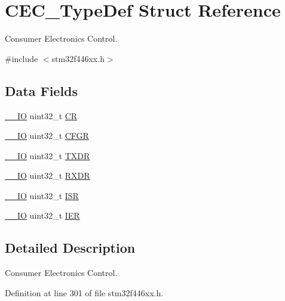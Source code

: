 \hypertarget{struct_c_e_c___type_def}{}\section{C\+E\+C\+\_\+\+Type\+Def Struct Reference}
\label{struct_c_e_c___type_def}


Consumer Electronics Control.  




{\ttfamily \#include $<$stm32f446xx.\+h$>$}

\subsection*{Data Fields}
\begin{DoxyCompactItemize}
\item 
\hyperlink{core__sc300_8h_aec43007d9998a0a0e01faede4133d6be}{\+\_\+\+\_\+\+IO} uint32\+\_\+t \hyperlink{struct_c_e_c___type_def_ab40c89c59391aaa9d9a8ec011dd0907a}{CR}
\item 
\hyperlink{core__sc300_8h_aec43007d9998a0a0e01faede4133d6be}{\+\_\+\+\_\+\+IO} uint32\+\_\+t \hyperlink{struct_c_e_c___type_def_a26f1e746ccbf9c9f67e7c60e61085ec1}{C\+F\+GR}
\item 
\hyperlink{core__sc300_8h_aec43007d9998a0a0e01faede4133d6be}{\+\_\+\+\_\+\+IO} uint32\+\_\+t \hyperlink{struct_c_e_c___type_def_ad7e8d785fff2acfeb8814e43bda8dd72}{T\+X\+DR}
\item 
\hyperlink{core__sc300_8h_aec43007d9998a0a0e01faede4133d6be}{\+\_\+\+\_\+\+IO} uint32\+\_\+t \hyperlink{struct_c_e_c___type_def_a9bf29a9104cb5569823ab892174f9c8c}{R\+X\+DR}
\item 
\hyperlink{core__sc300_8h_aec43007d9998a0a0e01faede4133d6be}{\+\_\+\+\_\+\+IO} uint32\+\_\+t \hyperlink{struct_c_e_c___type_def_ab3c49a96815fcbee63d95e1e74f20e75}{I\+SR}
\item 
\hyperlink{core__sc300_8h_aec43007d9998a0a0e01faede4133d6be}{\+\_\+\+\_\+\+IO} uint32\+\_\+t \hyperlink{struct_c_e_c___type_def_a6566f8cfbd1d8aa7e8db046aa35e77db}{I\+ER}
\end{DoxyCompactItemize}


\subsection{Detailed Description}
Consumer Electronics Control. 

Definition at line 301 of file stm32f446xx.\+h.



